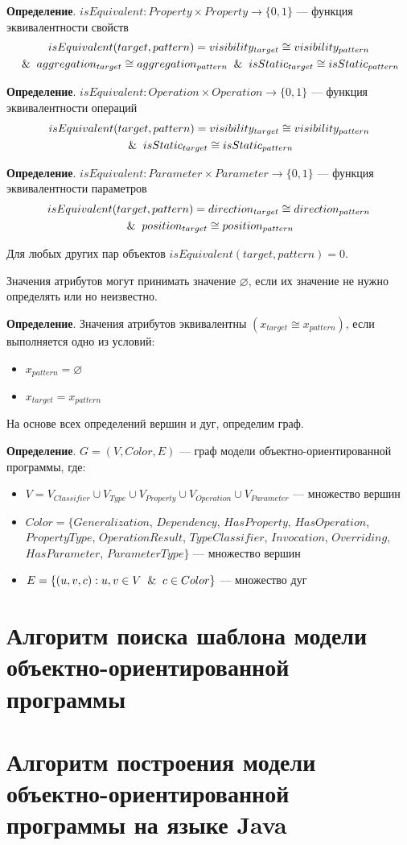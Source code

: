 \textbf{Определение}. $isEquivalent: Property \times Property \to \{ 0, 1 \}$
--- функция эквивалентности свойств
%
\begin{multline*}
isEquivalent(target, pattern) = visibility_{target} \cong visibility_{pattern} \\
\And aggregation_{target} \cong aggregation_{pattern} \And isStatic_{target} \cong isStatic_{pattern}
\end{multline*}

\textbf{Определение}. $isEquivalent: Operation \times Operation \to \{ 0, 1 \}$
--- функция эквивалентности операций
%
\begin{multline*}
isEquivalent(target, pattern) = visibility_{target} \cong visibility_{pattern} \\
\And isStatic_{target} \cong isStatic_{pattern}
\end{multline*}

\textbf{Определение}. $isEquivalent: Parameter \times Parameter \to \{ 0, 1 \}$
--- функция эквивалентности параметров
%
\begin{multline*}
isEquivalent(target, pattern) = direction_{target} \cong direction_{pattern} \\
\And position_{target} \cong position_{pattern}
\end{multline*}

Для любых других пар объектов $isEquivalent(target, pattern) = 0$.

Значения атрибутов могут принимать значение $\varnothing$,
если их значение не нужно определять или но неизвестно.

\textbf{Определение}. Значения атрибутов эквивалентны
$(x_{target} \cong x_{pattern})$, если выполняется одно из условий:
\begin{itemize}
\item $x_{pattern} = \varnothing$
\item $x_{target} = x_{pattern}$
\end{itemize}

На основе всех определений вершин и дуг, определим граф.

\textbf{Определение}. $G = (V, Color, E)$ --- граф модели объектно-ориентированной программы, где:
\begin{itemize}
\item $V = V_{Classifier} \cup V_{Type} \cup V_{Property} \cup V_{Operation} \cup V_{Parameter}$
--- множество вершин
\item $Color = \{ Generalization$, $Dependency$, $HasProperty$, $HasOperation$,
$PropertyType$, $OperationResult$, $TypeClassifier$, $Invocation$, $Overriding$,
$HasParameter$, $ParameterType \}$  --- множество вершин
\item $E = \{ (u, v, c) : u, v \in V \And c \in Color \}$ --- множество дуг
\end{itemize}

\section{Алгоритм поиска шаблона модели объектно-ориентированной программы}
\section{Алгоритм построения модели объектно-ориентированной программы на языке Java}
